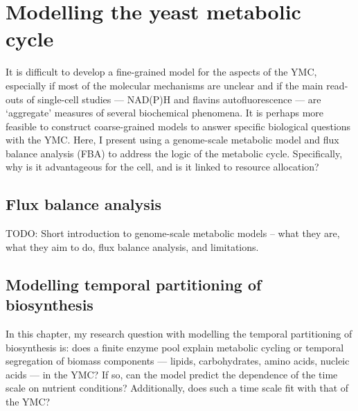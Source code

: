 \chapter{Modelling the yeast metabolic cycle}
\label{ch:model}

It is difficult to develop a fine-grained model for the aspects of the YMC,
especially if most of the molecular mechanisms are unclear
and if the main read-outs of single-cell studies --- NAD(P)H and flavins autofluorescence --- are `aggregate' measures of several biochemical phenomena.
It is perhaps more feasible to construct coarse-grained models to answer specific biological questions with the YMC.
Here, I present using a genome-scale metabolic model and flux balance analysis (FBA) to address the logic of the metabolic cycle.
Specifically, why is it advantageous for the cell, and is it linked to resource allocation?

\section{Flux balance analysis}
\label{sec:model-fba}

TODO: Short introduction to genome-scale metabolic models -- what they are, what they aim to do, flux balance analysis, and limitations.

\section{Modelling temporal partitioning of biosynthesis}
\label{sec:model-temporal}

In this chapter, my research question with modelling the temporal partitioning of biosynthesis is:
does a finite enzyme pool explain metabolic cycling or temporal segregation of biomass components --- lipids, carbohydrates, amino acids, nucleic acids --- in the YMC?
If so, can the model predict the dependence of the time scale on nutrient conditions?
Additionally, does such a time scale fit with that of the YMC?

